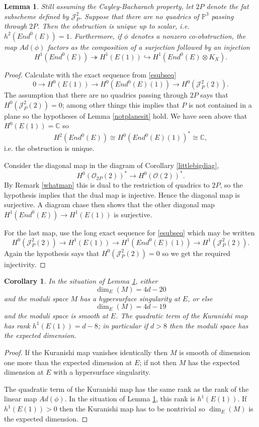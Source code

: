 \documentclass{amsart}
\theoremstyle{plain}
\newtheorem{lemma}[theorem]{Lemma}
\newtheorem{corollary}[theorem]{Corollary}
\numberwithin{equation}{section}
\begin{document}
\begin{lemma}
\label{2Plem}
Still assuming the Cayley-Bacharach property, 
let $2P$ denote the fat subscheme defined by ${{\mathcal J}} ^2_P$. Suppose that there
are no quadrics of ${{\mathbb P}} ^3$ 
passing through $2P$. Then the obstruction is unique up to scalar, i.e. 
$h^2(End^0(E))=1$. Furthermore, if $\phi$ denotes a nonzero co-obstruction,
the map $Ad(\phi )$ factors as the composition 
of a surjection followed by an injection
$$
H^1(End ^0(E))\twoheadrightarrow H^1(E(1))
\hookrightarrow H^1(End ^0(E)\otimes K_X).
$$
\end{lemma}
\begin{proof} 
Calculate with the exact sequence from \eqref{esubseq}
$$
0 \rightarrow H^0(E(1)) \rightarrow H^0(End ^0(E)(1)) \rightarrow H^0({{\mathcal J}} _P^2(2)).
$$
The assumption that there are no quadrics passing through $2P$ says that
$H^0({{\mathcal J}} _P^2(2))=0$; among other things this implies that 
$P$ is not contained in a plane so the hypotheses of Lemma \ref{notplanesit} hold. 
We have seen above that $H^0(E(1))={{\mathbb C}}$ so 
$$
H^2(End^0(E))\cong H^0(End^0(E)(1)) ^{\ast}\cong {{\mathbb C}} ,
$$
i.e. the obstruction is unique. 

Consider the diagonal map in the diagram of Corollary \ref{littlebigdiag},
$$
H^0({{\mathcal O}}_{2P}(2))^{\ast} \rightarrow H^0({{\mathcal O}} (2))^{\ast}.
$$
By Remark \ref{whatmap} this is dual to the restriction of quadrics to $2P$,
so the hypothesis implies that the dual map is injective. Hence the
diagonal map is surjective. A diagram chase then shows that the other
diagonal map 
$H^1(End ^0(E))\rightarrow H^1(E(1))$ is surjective. 

For the last map, use the long exact sequence for \eqref{esubseq} which
may be written
$$
H^0({{\mathcal J}} ^2_P(2))\rightarrow H^1(E(1))\rightarrow H^1(End ^0(E)(1)) \rightarrow H^1({{\mathcal J}} ^2_P(2)) .
$$
Again the hypothesis says that $H^0({{\mathcal J}} ^2_P(2))=0$ so we get the required injectivity.
\end{proof}

\begin{corollary}
\label{obs1dichot}
In the situation of Lemma \ref{2Plem}, 
either 
$$
\dim _E(M )= 4d-20 
$$  
and the moduli space $M$ has a hypersurface singularity at $E$,
or else 
$$
\dim _E(M )= 4d-19 
$$  
and the moduli space is smooth at $E$. The quadratic term of the Kuranishi map 
has rank $h^1(E(1))=d-8$; in particular if $d>8$ then the moduli space has the expected dimension.
\end{corollary}
\begin{proof}
If the Kuranishi map vanishes identically then $M$ is smooth of dimension one more than
the expected dimension at $E$; if not then $M$ has the expected dimension at $E$
with a hypersurface singularity. 

The quadratic term of the Kuranishi map has the same rank as the rank of the linear
map $Ad(\phi )$. In the situation of Lemma \ref{2Plem}, this rank is $h^1(E(1))$.
If $h^1(E(1)) > 0$ then the Kuranishi map has to be nontrivial so $\dim _E(M)$
is the expected dimension.
\end{proof}
\end{document}
